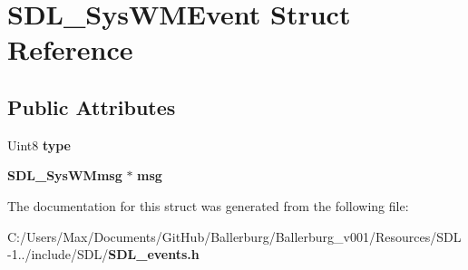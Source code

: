 \section{S\+D\+L\+\_\+\+Sys\+W\+M\+Event Struct Reference}
\label{struct_s_d_l___sys_w_m_event}
\subsection*{Public Attributes}
\begin{DoxyCompactItemize}
\item 
Uint8 {\bfseries type}\label{struct_s_d_l___sys_w_m_event_acd0775d6cfbde063c9377c8e1eb0f9bf}

\item 
{\bf S\+D\+L\+\_\+\+Sys\+W\+Mmsg} $\ast$ {\bfseries msg}\label{struct_s_d_l___sys_w_m_event_ad5e3dc68aa15582cd0641847d41c74e8}

\end{DoxyCompactItemize}


The documentation for this struct was generated from the following file\+:\begin{DoxyCompactItemize}
\item 
C\+:/\+Users/\+Max/\+Documents/\+Git\+Hub/\+Ballerburg/\+Ballerburg\+\_\+v001/\+Resources/\+S\+D\+L-\/1../include/\+S\+D\+L/{\bf S\+D\+L\+\_\+events.\+h}\end{DoxyCompactItemize}

